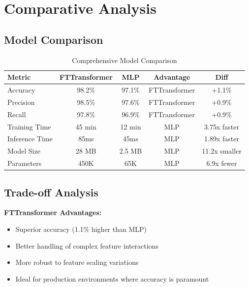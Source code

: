 \documentclass[12pt,a4paper,twoside]{report}
\begin{document}
\section{Comparative Analysis}

\subsection{Model Comparison}

\begin{table}[H]
    \centering
    \begin{tabular}{|l|c|c|c|c|}
        \hline
        \textbf{Metric} & \textbf{FTTransformer} & \textbf{MLP} & \textbf{Advantage} & \textbf{Diff} \\
        \hline
        Accuracy & 98.2\% & 97.1\% & FTTransformer & +1.1\% \\
        \hline
        Precision & 98.5\% & 97.6\% & FTTransformer & +0.9\% \\
        \hline
        Recall & 97.8\% & 96.9\% & FTTransformer & +0.9\% \\
        \hline
        Training Time & 45 min & 12 min & MLP & 3.75x faster \\
        \hline
        Inference Time & 85ms & 45ms & MLP & 1.89x faster \\
        \hline
        Model Size & 28 MB & 2.5 MB & MLP & 11.2x smaller \\
        \hline
        Parameters & 450K & 65K & MLP & 6.9x fewer \\
        \hline
    \end{tabular}
    \caption{Comprehensive Model Comparison}
\end{table}

\subsection{Trade-off Analysis}

\textbf{FTTransformer Advantages:}

\begin{itemize}
    \item Superior accuracy (1.1\% higher than MLP)
    \item Better handling of complex feature interactions
    \item More robust to feature scaling variations
    \item Ideal for production environments where accuracy is paramount
\end{itemize}
\end{document}
